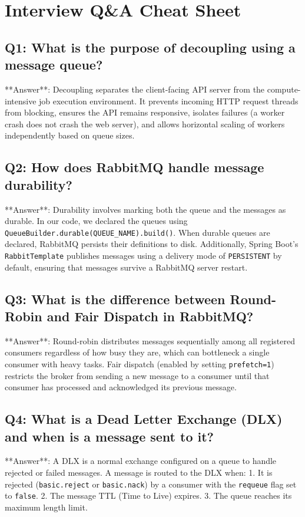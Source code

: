 \documentclass[11pt,a4paper]{article}
\begin{document}
\newpage
\section{Interview Q\&A Cheat Sheet}

\subsection*{Q1: What is the purpose of decoupling using a message queue?}
**Answer**: Decoupling separates the client-facing API server from the compute-intensive job execution environment. It prevents incoming HTTP request threads from blocking, ensures the API remains responsive, isolates failures (a worker crash does not crash the web server), and allows horizontal scaling of workers independently based on queue sizes.

\subsection*{Q2: How does RabbitMQ handle message durability?}
**Answer**: Durability involves marking both the queue and the messages as durable. In our code, we declared the queues using \texttt{QueueBuilder.durable(QUEUE\_NAME).build()}. When durable queues are declared, RabbitMQ persists their definitions to disk. Additionally, Spring Boot's \texttt{RabbitTemplate} publishes messages using a delivery mode of \texttt{PERSISTENT} by default, ensuring that messages survive a RabbitMQ server restart.

\subsection*{Q3: What is the difference between Round-Robin and Fair Dispatch in RabbitMQ?}
**Answer**: Round-robin distributes messages sequentially among all registered consumers regardless of how busy they are, which can bottleneck a single consumer with heavy tasks. Fair dispatch (enabled by setting \texttt{prefetch=1}) restricts the broker from sending a new message to a consumer until that consumer has processed and acknowledged its previous message.

\subsection*{Q4: What is a Dead Letter Exchange (DLX) and when is a message sent to it?}
**Answer**: A DLX is a normal exchange configured on a queue to handle rejected or failed messages. A message is routed to the DLX when:
1. It is rejected (\texttt{basic.reject} or \texttt{basic.nack}) by a consumer with the \texttt{requeue} flag set to \texttt{false}.
2. The message TTL (Time to Live) expires.
3. The queue reaches its maximum length limit.
\end{document}
